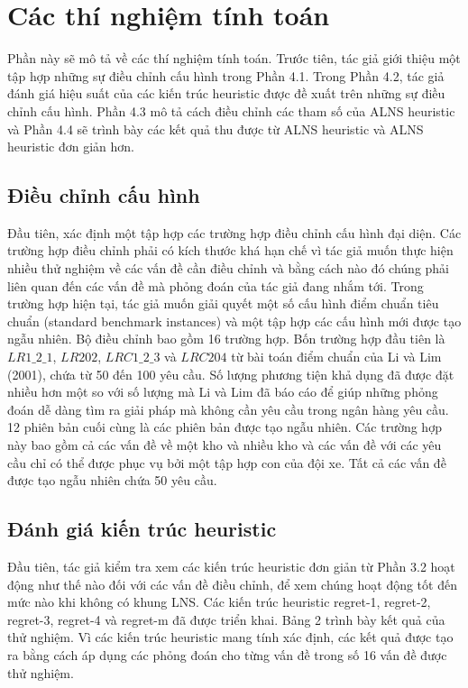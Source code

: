 \chapter{Các thí nghiệm tính toán}
Phần này sẽ mô tả về các thí nghiệm tính toán. Trước tiên, tác giả giới thiệu một tập hợp những sự điều chỉnh cấu hình trong Phần 4.1. Trong Phần 4.2, tác giả đánh giá hiệu suất của các kiến trúc heuristic được đề xuất trên những sự điều chỉnh cấu hình. Phần 4.3 mô tả cách điều chỉnh các tham số của ALNS heuristic và Phần 4.4 sẽ trình bày các kết quả thu được từ ALNS heuristic và ALNS heuristic đơn giản hơn.

\section{Điều chỉnh cấu hình}
Đầu tiên, xác định một tập hợp các trường hợp điều chỉnh cấu hình đại diện. Các trường hợp điều chỉnh phải có kích thước khá hạn chế vì tác giả muốn thực hiện nhiều thử nghiệm về các vấn đề cần điều chỉnh và bằng cách nào đó chúng phải liên quan đến các vấn đề mà phỏng đoán của tác giả đang nhắm tới. Trong trường hợp hiện tại, tác giả muốn giải quyết một số cấu hình điểm chuẩn tiêu chuẩn (standard benchmark instances) và một tập hợp các cấu hình mới được tạo ngẫu nhiên.
Bộ điều chỉnh bao gồm 16 trường hợp. Bốn trường hợp đầu tiên là $LR1\_2\_1$, $LR202$, $LRC1\_2\_3$ và $LRC204$ từ bài toán điểm chuẩn của Li và Lim (2001), chứa từ 50 đến 100 yêu cầu. Số lượng phương tiện khả dụng đã được đặt nhiều hơn một so với số lượng mà Li và Lim đã báo cáo để giúp những phỏng đoán dễ dàng tìm ra giải pháp mà không cần yêu cầu trong ngân hàng yêu cầu. 12 phiên bản cuối cùng là các phiên bản được tạo ngẫu nhiên. Các trường hợp này bao gồm cả các vấn đề về một kho và nhiều kho và các vấn đề với các yêu cầu chỉ có thể được phục vụ bởi một tập hợp con của đội xe. Tất cả các vấn đề được tạo ngẫu nhiên chứa 50 yêu cầu.

\section{Đánh giá kiến trúc heuristic}
Đầu tiên, tác giả kiểm tra xem các kiến trúc heuristic đơn giản từ Phần 3.2 hoạt động như thế nào đối với các vấn đề điều chỉnh, để xem chúng hoạt động tốt đến mức nào khi không có khung LNS. Các kiến trúc heuristic regret-1, regret-2, regret-3, regret-4 và regret-m đã được triển khai. Bảng 2 trình bày kết quả của thử nghiệm. Vì các kiến trúc heuristic mang tính xác định, các kết quả được tạo ra bằng cách áp dụng các phỏng đoán cho từng vấn đề trong số 16 vấn đề được thử nghiệm.

